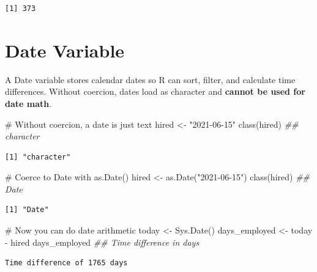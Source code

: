 \documentclass[
  letterpaper,
  DIV=11,
  numbers=noendperiod]{scrreprt}
\newenvironment{Shaded}{\begin{snugshade}}{\end{snugshade}}
\newcommand{\CommentTok}[1]{\textcolor[rgb]{0.37,0.37,0.37}{#1}}
\newcommand{\DocumentationTok}[1]{\textcolor[rgb]{0.37,0.37,0.37}{\textit{#1}}}
\newcommand{\FunctionTok}[1]{\textcolor[rgb]{0.28,0.35,0.67}{#1}}
\newcommand{\NormalTok}[1]{\textcolor[rgb]{0.00,0.23,0.31}{#1}}
\newcommand{\OtherTok}[1]{\textcolor[rgb]{0.00,0.23,0.31}{#1}}
\newcommand{\SpecialCharTok}[1]{\textcolor[rgb]{0.37,0.37,0.37}{#1}}
\newcommand{\StringTok}[1]{\textcolor[rgb]{0.13,0.47,0.30}{#1}}
\begin{document}
\begin{verbatim}
[1] 373
\end{verbatim}

\section{Date Variable}\label{date-variable}

A Date variable stores calendar dates so R can sort, filter, and
calculate time differences. Without coercion, dates load as character
and \textbf{cannot be used for date math}.

\begin{Shaded}
\begin{Highlighting}[]
\CommentTok{\# Without coercion, a date is just text}
\NormalTok{hired }\OtherTok{\textless{}{-}} \StringTok{"2021{-}06{-}15"}
\FunctionTok{class}\NormalTok{(hired)  }\DocumentationTok{\#\# \textquotesingle{}character\textquotesingle{}}
\end{Highlighting}
\end{Shaded}

\begin{verbatim}
[1] "character"
\end{verbatim}

\begin{Shaded}
\begin{Highlighting}[]
\CommentTok{\# Coerce to Date with as.Date()}
\NormalTok{hired }\OtherTok{\textless{}{-}} \FunctionTok{as.Date}\NormalTok{(}\StringTok{"2021{-}06{-}15"}\NormalTok{)}
\FunctionTok{class}\NormalTok{(hired)  }\DocumentationTok{\#\# \textquotesingle{}Date\textquotesingle{}}
\end{Highlighting}
\end{Shaded}

\begin{verbatim}
[1] "Date"
\end{verbatim}

\begin{Shaded}
\begin{Highlighting}[]
\CommentTok{\# Now you can do date arithmetic}
\NormalTok{today }\OtherTok{\textless{}{-}} \FunctionTok{Sys.Date}\NormalTok{()}
\NormalTok{days\_employed }\OtherTok{\textless{}{-}}\NormalTok{ today }\SpecialCharTok{{-}}\NormalTok{ hired}
\NormalTok{days\_employed  }\DocumentationTok{\#\# Time difference in days}
\end{Highlighting}
\end{Shaded}

\begin{verbatim}
Time difference of 1765 days
\end{verbatim}
\end{document}
